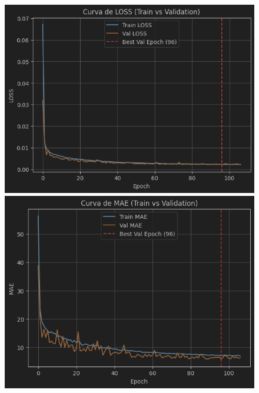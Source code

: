 \begin{figure}[H]
	\centering
	\begin{minipage}{0.48\textwidth}
		\centering
		\includegraphics[width=\linewidth]{includes/cap5/graphs/sid2_trafficformer_loss.png}
		\vspace{0.2cm}
		\includegraphics[width=\linewidth]{includes/cap5/graphs/sid2_trafficformer_mae.png}
		\vspace{0.2cm}

\end{minipage}
\end{figure}
